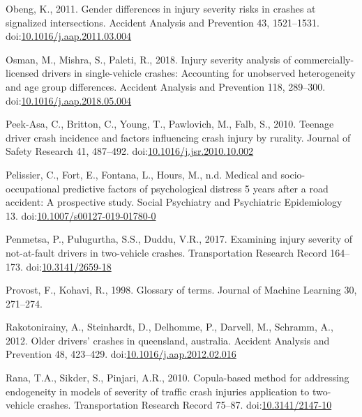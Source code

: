 \documentclass[]{elsarticle} %
\begin{document}
\leavevmode\hypertarget{ref-Obeng2011gender}{}%
Obeng, K., 2011. Gender differences in injury severity risks in crashes
at signalized intersections. Accident Analysis and Prevention 43,
1521--1531.
doi:\href{https://doi.org/10.1016/j.aap.2011.03.004}{10.1016/j.aap.2011.03.004}

\leavevmode\hypertarget{ref-Osman2018injury}{}%
Osman, M., Mishra, S., Paleti, R., 2018. Injury severity analysis of
commercially-licensed drivers in single-vehicle crashes: Accounting for
unobserved heterogeneity and age group differences. Accident Analysis
and Prevention 118, 289--300.
doi:\href{https://doi.org/10.1016/j.aap.2018.05.004}{10.1016/j.aap.2018.05.004}

\leavevmode\hypertarget{ref-Peek-Asa2010teenage}{}%
Peek-Asa, C., Britton, C., Young, T., Pawlovich, M., Falb, S., 2010.
Teenage driver crash incidence and factors influencing crash injury by
rurality. Journal of Safety Research 41, 487--492.
doi:\href{https://doi.org/10.1016/j.jsr.2010.10.002}{10.1016/j.jsr.2010.10.002}

\leavevmode\hypertarget{ref-Pelissier2019medical}{}%
Pelissier, C., Fort, E., Fontana, L., Hours, M., n.d. Medical and
socio-occupational predictive factors of psychological distress 5 years
after a road accident: A prospective study. Social Psychiatry and
Psychiatric Epidemiology 13.
doi:\href{https://doi.org/10.1007/s00127-019-01780-0}{10.1007/s00127-019-01780-0}

\leavevmode\hypertarget{ref-Penmetsa2017examining}{}%
Penmetsa, P., Pulugurtha, S.S., Duddu, V.R., 2017. Examining injury
severity of not-at-fault drivers in two-vehicle crashes. Transportation
Research Record 164--173.
doi:\href{https://doi.org/10.3141/2659-18}{10.3141/2659-18}

\leavevmode\hypertarget{ref-Provost1998glossary}{}%
Provost, F., Kohavi, R., 1998. Glossary of terms. Journal of Machine
Learning 30, 271--274.

\leavevmode\hypertarget{ref-Rakotonirainy2012older}{}%
Rakotonirainy, A., Steinhardt, D., Delhomme, P., Darvell, M., Schramm,
A., 2012. Older drivers' crashes in queensland, australia. Accident
Analysis and Prevention 48, 423--429.
doi:\href{https://doi.org/10.1016/j.aap.2012.02.016}{10.1016/j.aap.2012.02.016}

\leavevmode\hypertarget{ref-Rana2010copula}{}%
Rana, T.A., Sikder, S., Pinjari, A.R., 2010. Copula-based method for
addressing endogeneity in models of severity of traffic crash injuries
application to two-vehicle crashes. Transportation Research Record
75--87. doi:\href{https://doi.org/10.3141/2147-10}{10.3141/2147-10}
\end{document}
